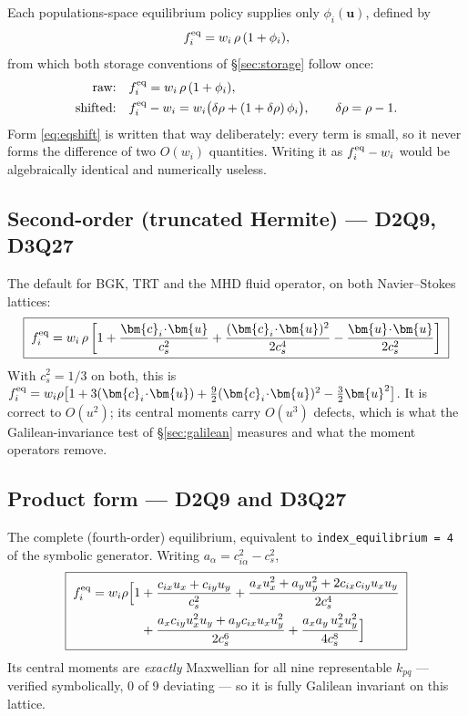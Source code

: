 \documentclass[11pt,a4paper]{article}
\newcommand{\code}[1]{\texttt{\small #1}}
\newcommand{\cs}{c_s}
\newcommand{\ci}{\bm{c}_i}
\newcommand{\uu}{\bm{u}}
\begin{document}
Each populations-space equilibrium policy supplies only $\phi_i(\uu)$, defined by
\begin{equation}
  f_i^{\rm eq} = w_i\,\rho\,(1+\phi_i),
\end{equation}
from which both storage conventions of \S\ref{sec:storage} follow once:
\begin{align}
  \text{raw:}     &\quad f_i^{\rm eq}       = w_i\,\rho\,(1+\phi_i), \\
  \text{shifted:} &\quad f_i^{\rm eq} - w_i = w_i\big(\delta\rho + (1+\delta\rho)\,\phi_i\big),
  \qquad \delta\rho = \rho-1 .
  \label{eq:eqshift}
\end{align}
Form \eqref{eq:eqshift} is written that way deliberately: every term is small, so
it never forms the difference of two $O(w_i)$ quantities. Writing it as
$f_i^{\rm eq}-w_i$ would be algebraically identical and numerically useless.

\subsection{Second-order (truncated Hermite) --- D2Q9, D3Q27}
\label{sec:eq2}

The default for BGK, TRT and the MHD fluid operator, on both Navier--Stokes
lattices:
\begin{equation}
  \boxed{\;
  f_i^{\rm eq} = w_i\,\rho\left[
      1 + \frac{\ci\!\cdot\!\uu}{\cs^2}
        + \frac{(\ci\!\cdot\!\uu)^2}{2\cs^4}
        - \frac{\uu\!\cdot\!\uu}{2\cs^2}\right] \;}
  \label{eq:so}
\end{equation}
With $\cs^2=1/3$ on both, this is
$f_i^{\rm eq}=w_i\rho\big[1+3(\ci\!\cdot\!\uu)+\tfrac92(\ci\!\cdot\!\uu)^2-\tfrac32\uu^2\big]$.
It is correct to $O(u^2)$; its central moments carry $O(u^3)$ defects, which is
what the Galilean-invariance test of \S\ref{sec:galilean} measures and what the
moment operators remove.

\subsection{Product form --- D2Q9 and D3Q27}
\label{sec:eqprod}

The complete (fourth-order) equilibrium, equivalent to
\code{index\_equilibrium = 4} of the symbolic generator. Writing
$a_\alpha = c_{i\alpha}^2-\cs^2$,
\begin{equation}
  \boxed{\;
  \begin{aligned}
  f_i^{\rm eq} = w_i\rho\Big[1
    &+ \frac{c_{ix}u_x+c_{iy}u_y}{\cs^2}
     + \frac{a_x u_x^2 + a_y u_y^2 + 2c_{ix}c_{iy}u_xu_y}{2\cs^4} \\
    &+ \frac{a_x c_{iy} u_x^2 u_y + a_y c_{ix} u_x u_y^2}{2\cs^6}
     + \frac{a_x a_y\, u_x^2 u_y^2}{4\cs^8}\Big]
  \end{aligned}\;}
  \label{eq:prod9}
\end{equation}
Its central moments are \emph{exactly} Maxwellian for all nine representable
$k_{pq}$ --- verified symbolically, 0 of 9 deviating --- so it is fully Galilean
invariant on this lattice.
\end{document}
